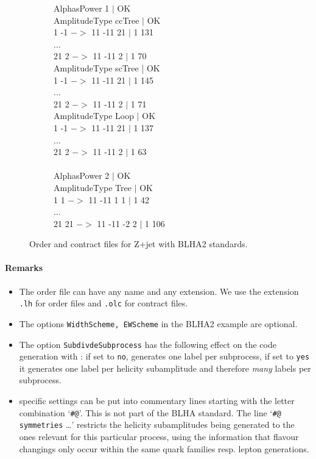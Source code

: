 \begin{figure}[h]
\begin{subfigure}[]{0.49\textwidth}
{{AlphasPower 1 $|$ OK\\
AmplitudeType ccTree $|$ OK\\
1 -1 $->$ 11 -11 21 $|$ 1 131\\
...\\
21 2 $->$ 11 -11 2 $|$ 1 70\\
AmplitudeType scTree | OK\\
1 -1 $->$ 11 -11 21 $|$ 1 145\\
...\\
21 2 $->$ 11 -11 2 $|$ 1 71\\
AmplitudeType Loop $|$ OK\\
1 -1 $->$ 11 -11 21 $|$ 1 137\\
...\\
21 2 $->$ 11 -11 2 $|$ 1 63\\
\\
AlphasPower 2 $|$ OK\\
AmplitudeType Tree $|$ OK\\
1 1 $->$ 11 -11 1 1 $|$ 1 42\\
...\\
21 21 $->$ 11 -11 -2 2 $|$ 1 106\\}
}
\end{subfigure}
\caption{Order and contract files for Z+jet with BLHA2 standards.}
\label{fig:BLHA2}
\end{figure}  

\paragraph{Remarks}
\begin{itemize}
\item The order file can have any name and any extension.
      We use  the extension \texttt{.lh}
      for order files and \texttt{.olc} for contract files.
\item The options \texttt{WidthScheme, EWScheme} in the BLHA2  example are optional.
\item The option \texttt{SubdivdeSubprocess}  has the following effect
      on the code generation with \gosam{}: if set to 
      \texttt{no}, \gosam{} generates one label per subprocess, if set to
      \texttt{yes} it generates one label per helicity subamplitude
      and therefore \emph{many} labels per subprocess.
      
\item \gosam{} specific settings can be put into commentary lines starting
      with the letter combination `\texttt{\#@}'. This is not part of the
      BLHA standard. The line `\texttt{\#@ symmetries} \dots' restricts the
      helicity subamplitudes being generated to the ones relevant for this
      particular process, using the information that flavour changings only occur within 
      the same quark families resp. lepton generations.
\end{itemize}

